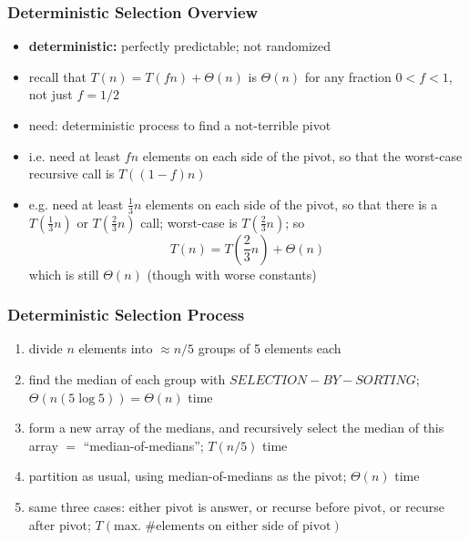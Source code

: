 \documentclass{beamer}
\begin{document}
\begin{frame} \frametitle{Deterministic Selection Overview}
\begin{itemize}
  \item \textbf{deterministic:} perfectly predictable; not randomized
  \item recall that $T(n) = T(fn) + \Theta(n)$ is $\Theta(n)$ for any fraction $0<f<1$,
    not just $f=1/2$
  \item need: deterministic process to find a not-terrible pivot
  \item i.e. need at least $fn$ elements on each side of the pivot, so that
    the worst-case recursive call is $T((1-f)n)$
  \item e.g. need at least $\frac{1}{3}n$ elements on each side of the pivot,
    so that there is a $T(\frac{1}{3}n)$ or $T(\frac{2}{3}n)$ call;
    worst-case is $T(\frac{2}{3}n)$; so
    \[ T(n)=T(\frac{2}{3}n) + \Theta(n) \]
    which is still $\Theta(n)$ (though with worse constants)
\end{itemize}
\end{frame}

\begin{frame} \frametitle{Deterministic Selection Process}
\begin{enumerate}
  \item divide $n$ elements into $\approx n/5$ groups of 5 elements each
  \item find the median of each group with $SELECTION-BY-SORTING$;
    $\Theta(n(5 \log 5))=\Theta(n)$ time
  \item form a new array of the medians, and recursively select the median
    of this array $=$ ``median-of-medians''; $T(n/5)$ time
  \item partition as usual, using median-of-medians as the pivot; $\Theta(n)$ time
  \item same three cases: either pivot is answer, or recurse before pivot, or
    recurse after pivot; $T(\text{max. \# elements on either side of pivot})$
\end{enumerate}
\end{frame}
\end{document}
